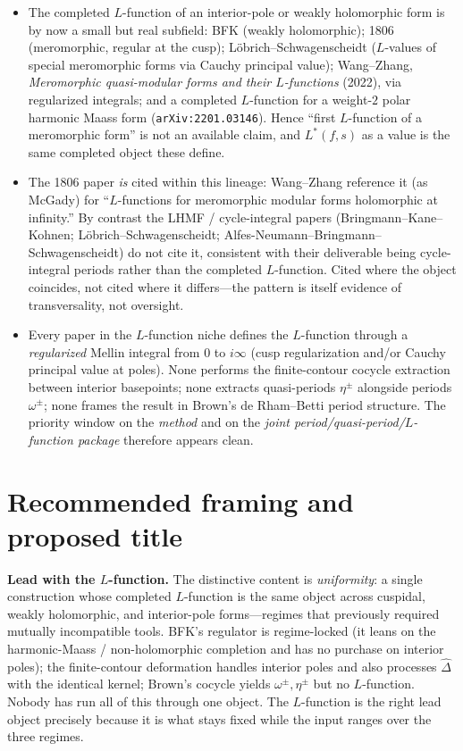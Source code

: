 \documentclass[11pt]{article}
\newcommand{\Lstar}{L^{*}}
\begin{document}
\begin{itemize}[leftmargin=1.4em]
\item The completed $L$-function of an interior-pole or weakly holomorphic form is by now
a small but real subfield: BFK (weakly holomorphic); 1806 (meromorphic, regular at the
cusp); L\"obrich--Schwagenscheidt ($L$-values of special meromorphic forms via Cauchy
principal value); Wang--Zhang, \emph{Meromorphic quasi-modular forms and their
$L$-functions} (2022), via regularized integrals; and a completed $L$-function for a
weight-$2$ polar harmonic Maass form (\texttt{arXiv:2201.03146}). Hence ``first
$L$-function of a meromorphic form'' is not an available claim, and $\Lstar(f,s)$ as a
value is the same completed object these define.
\item The 1806 paper \emph{is} cited within this lineage: Wang--Zhang reference it (as
McGady) for ``$L$-functions for meromorphic modular forms holomorphic at infinity.'' By
contrast the LHMF / cycle-integral papers (Bringmann--Kane--Kohnen;
L\"obrich--Schwagenscheidt; Alfes-Neumann--Bringmann--Schwagenscheidt) do not cite it,
consistent with their deliverable being cycle-integral periods rather than the completed
$L$-function. Cited where the object coincides, not cited where it differs---the pattern
is itself evidence of transversality, not oversight.
\item Every paper in the $L$-function niche defines the $L$-function through a
\emph{regularized} Mellin integral from $0$ to $i\infty$ (cusp regularization and/or Cauchy
principal value at poles). None performs the finite-contour cocycle extraction between
interior basepoints; none extracts quasi-periods $\eta^{\pm}$ alongside periods
$\omega^{\pm}$; none frames the result in Brown's de Rham--Betti period structure. The
priority window on the \emph{method} and on the \emph{joint period/quasi-period/$L$-function
package} therefore appears clean.
\end{itemize}

\section{Recommended framing and proposed title}

\textbf{Lead with the $L$-function.} The distinctive content is \emph{uniformity}: a single
construction whose completed $L$-function is the same object across cuspidal, weakly
holomorphic, and interior-pole forms---regimes that previously required mutually incompatible
tools. BFK's regulator is regime-locked (it leans on the harmonic-Maass / non-holomorphic
completion and has no purchase on interior poles); the finite-contour deformation handles
interior poles and also processes $\widehat\Delta$ with the identical kernel; Brown's cocycle
yields $\omega^{\pm},\eta^{\pm}$ but no $L$-function. Nobody has run all of this through one
object. The $L$-function is the right lead object precisely because it is what stays fixed
while the input ranges over the three regimes.
\end{document}
